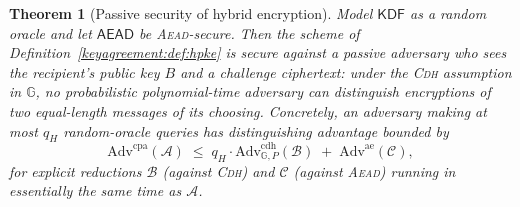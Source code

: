 \documentclass[11pt,a4paper]{article}
\newtheorem{theorem}{Theorem}[section]
\theoremstyle{definition}
\theoremstyle{remark}
\newcommand{\G}{\ensuremath{\mathbb{G}}}
\begin{document}
\begin{theorem}[Passive security of hybrid encryption]\label{keyagreement:thm:hpke-secure}
Model \(\mathsf{KDF}\) as a random oracle and let \(\mathsf{AEAD}\) be \textsc{Aead}-secure. Then the scheme of Definition~\ref{keyagreement:def:hpke} is secure against a passive adversary who sees the recipient's public key \(B\) and a challenge ciphertext: under the \textsc{Cdh} assumption in \(\G\), no probabilistic polynomial-time adversary can distinguish encryptions of two equal-length messages of its choosing. Concretely, an adversary making at most \(q_H\) random-oracle queries has distinguishing advantage bounded by
\[
  \mathrm{Adv}^{\mathrm{cpa}}(\mathcal{A}) \;\le\; q_H \cdot \mathrm{Adv}^{\mathrm{cdh}}_{\G,P}(\mathcal{B}) \;+\; \mathrm{Adv}^{\mathrm{ae}}(\mathcal{C}),
\]
for explicit reductions \(\mathcal{B}\) (against \textsc{Cdh}) and \(\mathcal{C}\) (against \textsc{Aead}) running in essentially the same time as \(\mathcal{A}\).
\end{theorem}
\end{document}
